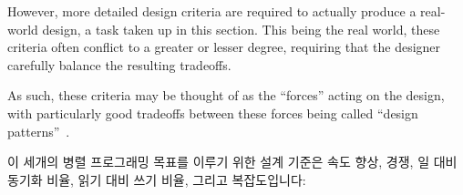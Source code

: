 However, more detailed design criteria are required to
actually produce a real-world design, a task taken up in this section.
This being the real world, these criteria often conflict to a
greater or lesser degree, requiring that the designer carefully
balance the resulting tradeoffs.

As such, these criteria may be thought of as the ``forces''
acting on the design, with particularly good tradeoffs between
these forces being called ``design patterns''~\cite{Alexander79,GOF95}.

\fi

이 세개의 병렬 프로그래밍 목표를 이루기 위한 설계 기준은 속도 향상, 경쟁,
일 대비 동기화 비율, 읽기 대비 쓰기 비율, 그리고 복잡도입니다:

\iffalse

The design criteria for attaining the three parallel-programming goals
are speedup,
contention, work-to-synchronization ratio, read-to-write ratio, and complexity:

\fi

